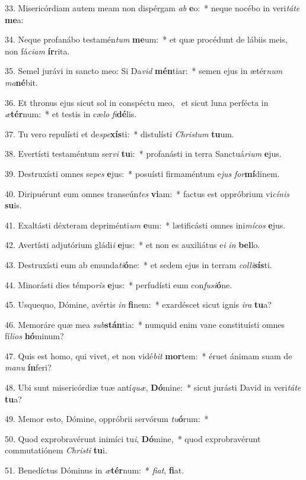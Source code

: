 33. Misericórdiam autem meam non dispérgam \textit{ab} \textbf{e}o:~*  neque nocébo in veri\textit{tá}\textit{te} \textbf{me}a:\

34. Neque profanábo testamén\textit{tum} \textbf{me}um:~*  et quæ procédunt de lábiis meis, non fá\textit{ci}\textit{am} \textbf{ír}rita.\

35. Semel jurávi in sancto meo: Si Da\textit{vid} \textbf{mén}tiar:~*  semen ejus in ætér\textit{num} \textit{ma}\textbf{né}bit.\

36. Et thronus ejus sicut sol in conspéctu meo, \dag\  et sicut luna perfécta in \textit{æ}\textbf{tér}num:~*  et testis in cæ\textit{lo} \textit{fi}\textbf{dé}lis.\

37. Tu vero repulísti et de\textit{spe}\textbf{xís}ti:~*  distulísti \textit{Chris}\textit{tum} \textbf{tu}um.\

38. Evertísti testaméntum ser\textit{vi} \textbf{tu}i:~*  profanásti in terra Sanctuá\textit{ri}\textit{um} \textbf{e}jus.\

39. Destruxísti omnes se\textit{pes} \textbf{e}jus:~*  posuísti firmaméntum e\textit{jus} \textit{for}\textbf{mí}dinem.\

40. Diripuérunt eum omnes transeún\textit{tes} \textbf{vi}am:~*  factus est oppróbrium vi\textit{cí}\textit{nis} \textbf{su}is.\

41. Exaltásti déxteram depriménti\textit{um} \textbf{e}um:~*  lætificásti omnes ini\textit{mí}\textit{cos} \textbf{e}jus.\

42. Avertísti adjutórium gládi\textit{i} \textbf{e}jus:~*  et non es auxiliátus e\textit{i} \textit{in} \textbf{bel}lo.\

43. Destruxísti eum ab emunda\textit{ti}\textbf{ó}ne:~*  et sedem ejus in terram \textit{col}\textit{li}\textbf{sís}ti.\

44. Minorásti dies témpo\textit{ris} \textbf{e}jus:~*  perfudísti eum con\textit{fu}\textit{si}\textbf{ó}ne.\

45. Usquequo, Dómine, avértis \textit{in} \textbf{fi}nem:~*  exardéscet sicut ignis \textit{i}\textit{ra} \textbf{tu}a?\

46. Memoráre quæ mea \textit{sub}\textbf{stán}tia:~*  numquid enim vane constituísti omnes fí\textit{li}\textit{os} \textbf{hó}minum?\

47. Quis est homo, qui vivet, et non vidé\textit{bit} \textbf{mor}tem:~*  éruet ánimam suam de \textit{ma}\textit{nu} \textbf{ín}feri?\

48. Ubi sunt misericórdiæ tuæ antí\textit{quæ}, \textbf{Dó}mine:~*  sicut jurásti David in veri\textit{tá}\textit{te} \textbf{tu}a?\

49. Memor esto, Dómine, oppróbrii servórum \textit{tu}\textbf{ó}rum:~*  \

50. Quod exprobravérunt inimíci tu\textit{i}, \textbf{Dó}mine,~*  quod exprobravérunt commutatiónem \textit{Chris}\textit{ti} \textbf{tu}i.\

51. Benedíctus Dóminus in \textit{æ}\textbf{tér}num:~*  \textit{fi}\textit{at}, \textbf{fi}at.\

